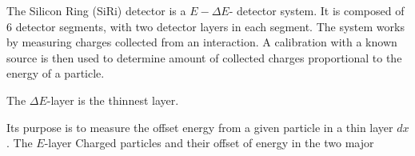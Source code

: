 The Silicon Ring (SiRi) detector is a $E - \Delta E$- detector system. It is composed of 6 detector segments, with two detector layers in each segment. The system works by measuring charges collected from an interaction. A calibration with a known source is then used to determine amount of collected charges proportional to the energy of a particle. 

The $\Delta E$-layer is the thinnest layer. 

Its purpose is to measure the offset energy from a given particle in a thin layer $dx$. The $E$-layer 
Charged particles and their offset of energy in the two major 